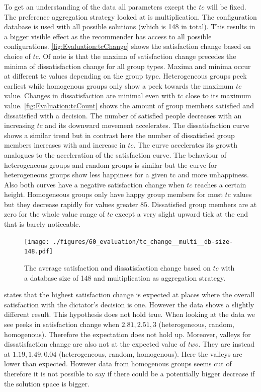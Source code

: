 To get an understanding of the data all parameters except the $tc$ will be fixed. The preference aggregation strategy looked at is multiplication. The configuration database is used with all possible solutions (which is 148 in total). This results in a bigger visible effect as the recommender has access to all possible configurations. \autoref{fig:Evaluation:tcChange} shows the satisfaction change based on choice of $tc$. Of note is that the maxima of satisfaction change precedes the minima of dissatisfaction change for all group types. Maxima and minima occur at different tc values depending on the group type. Heterogeneous groups peek earliest while homogenous groups only show a peek towards the maximum $tc$ value. Changes in dissatisfaction are minimal even with $tc$ close to its maximum value. \autoref{fig:Evaluation:tcCount} shows the amount of group members satisfied and dissatisfied with a decision. The number of satisfied people decreases with an increasing $tc$ and its downward movement accelerates. The dissatisfaction curve shows a similar trend but in contrast here the number of dissatisfied group members increases with and increase in $tc$. The curve accelerates its growth analogues to the acceleration of the satisfaction curve. The behaviour of heterogeneous groups and random groups is similar but the curve for heterogeneous groups show less happiness for a given tc and more unhappiness. Also both curves have a negative satisfaction change when $tc$ reaches a certain height. Homogeneous groups only have happy group members for most $tc$ values but they decrease rapidly for values greater $85$. Dissatisfied group members are at zero for the whole value range of $tc$ except a very slight upward tick at the end that is barely noticeable.

\begin{figure}
    \centering
    \texttt{[image: ./figures/60\_evaluation/tc\_change\_\_multi\_\_db-size-148.pdf]}
    \caption{The average satisfaction and dissatisfaction change based on $tc$ with a database size of 148 and multiplication as aggregation strategy.}
    \label{fig:Evaluation:tcChange}
\end{figure}

 states that the highest satisfaction change is expected at places where the overall satisfaction with the dictator's decision is one. However the data shows a slightly different result. This hypothesis does not hold true. When looking at the data we see peeks in satisfaction change when $2.81, 2.51, 3$ (heterogeneous, random, homogenous). Therefore the expectation does not hold up. Moreover, valleys for dissatisfaction change are also not at the expected value of \textit{two}. They are instead at $1.19, 1.49, 0.04$ (heterogeneous, random, homogenous). Here the valleys are lower than expected. However data from homogenous groups seems cut of therefore it is not possible to say if there could be a potentially bigger decrease if the solution space is bigger.

